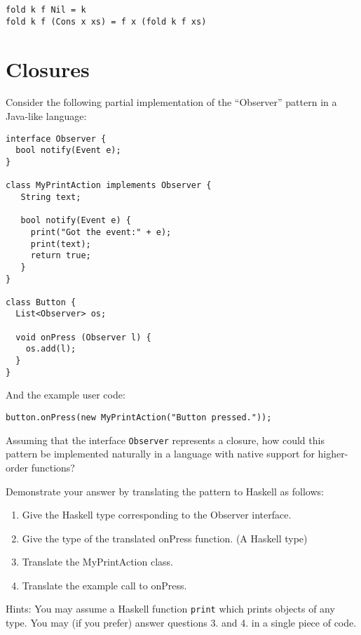 \documentclass{article}
\newcommand{\answer}[1]{}
\begin{document}
\begin{verbatim}
fold k f Nil = k
fold k f (Cons x xs) = f x (fold k f xs)
\end{verbatim}
\answer{
  \begin{verbatim}
    map f = fold Nil (\x -> Cons (f x))
    append xs ys = fold ys Cons xs
    reverse = fold Nil (\x xs -> append xs (Cons x Nil))
  \end{verbatim}
}
\section{Closures}

Consider the following partial implementation of the ``Observer''
pattern in a Java-like language:
\begin{verbatim}
interface Observer {
  bool notify(Event e);
}

class MyPrintAction implements Observer {
   String text;

   bool notify(Event e) {
     print("Got the event:" + e);
     print(text);
     return true;
   }
}

class Button {
  List<Observer> os;

  void onPress (Observer l) {
    os.add(l);
  }
}
\end{verbatim}

And the example user code:

\begin{verbatim}
button.onPress(new MyPrintAction("Button pressed."));
\end{verbatim}

Assuming that the interface \texttt{Observer} represents a closure, how
could this pattern be implemented naturally in a language with native
support for higher-order functions?

Demonstrate your answer by translating the pattern to Haskell as
follows:
\begin{enumerate}
\item Give the Haskell type corresponding to the Observer interface.
\item Give the type of the translated onPress function. (A Haskell type) 
\item Translate the MyPrintAction class. 
\item Translate the example call to onPress. 
\end{enumerate}
Hints: You may assume a Haskell function \texttt{print} which prints
objects of any type.  You may (if you prefer) answer questions 3. and
4. in a single piece of code.
\end{document}
